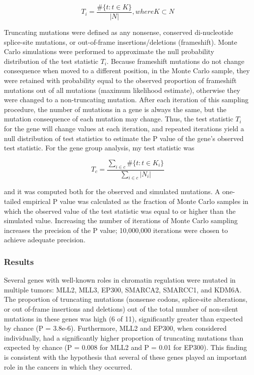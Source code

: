 \begin{equation}
T_i = \frac{\#\{t : t\in K\}}{|N|}, where K\subset N
\end{equation}

Truncating mutations were defined as any nonsense, conserved di-nucleotide splice-site mutations, or out-of-frame insertions/deletions (frameshift). Monte Carlo simulations were performed to approximate the null probability distribution of the test statistic $T_i$. Because frameshift mutations do not change consequence when moved to a different position, in the Monte Carlo sample, they were retained with probability equal to the observed proportion of frameshift mutations out of all mutations (maximum likelihood estimate), otherwise they were changed to a non-truncating mutation. After each iteration of this sampling procedure, the number of mutations in a gene is always the same, but the mutation consequence of each mutation may change. Thus, the test statistic $T_i$ for the gene will change values at each iteration, and repeated iterations yield a null distribution of test statistics to estimate the P value of the gene's observed test statistic. For the gene group analysis, my test statistic was

\begin{equation}
T_c = \frac{\sum_{i\in c}{\#\{t:t\in K_i\}}}{\sum_{i\in c}{|N_i|}}
\end{equation}

and it was computed both for the observed and simulated mutations. A one-tailed empirical P value was calculated as the fraction of Monte Carlo samples in which the observed value of the test statistic was equal to or higher than the simulated value. Increasing the number of iterations of Monte Carlo sampling increases the precision of the P value; 10,000,000 iterations were
chosen to achieve adequate precision.

\subsubsection{Results}

Several genes with well-known roles in chromatin regulation were mutated in multiple tumors: MLL2, MLL3, EP300, SMARCA2, SMARCC1, and KDM6A. The proportion of truncating mutations (nonsense codons, splice-site alterations, or out of-frame insertions and deletions) out of the total number of non-silent mutations in these genes was high (6 of 11), significantly greater than expected by chance (P = 3.8e-6). Furthermore, MLL2 and EP300, when considered individually, had a significantly higher proportion of truncating mutations than expected by chance (P = 0.008 for MLL2 and P = 0.01 for EP300). This finding is consistent with the hypothesis that several of these genes played an important role in the cancers in which they occurred.

